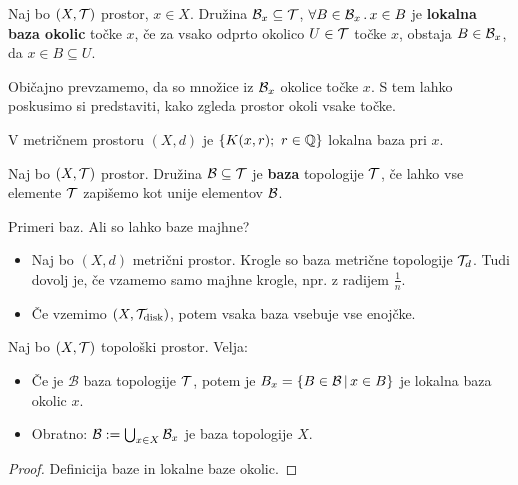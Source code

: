 \begin{definicija}
    Naj bo $(X, \mathcal{T})$ prostor, $x \in X$. Družina $\mathcal{B}_x \subseteq \mathcal{T}$, $\forall B \in \mathcal{B}_x \,.\, x \in B$ je \textbf{lokalna baza okolic} točke $x$, če za vsako odprto okolico $U \in \mathcal{T}$ točke $x$, obstaja $B \in \mathcal{B}_x$, da $x \in B \subseteq U$.
\end{definicija}

\begin{opomba}
    Običajno prevzamemo, da so množice iz $\mathcal{B}_x$ okolice točke $x$. S tem lahko poskusimo si predstaviti, kako zgleda prostor okoli vsake točke.
\end{opomba}

\begin{primer}
    V metričnem prostoru $(X, d)$ je $\{K(x,r); \ r \in \mathbb{Q}\}$ lokalna baza pri $x$.
\end{primer}

\begin{definicija}
    Naj bo $(X, \mathcal{T})$ prostor. Družina $\mathcal{B} \subseteq \mathcal{T}$ je \textbf{baza} topologije $\mathcal{T}$, če lahko vse elemente $\mathcal{T}$ zapišemo kot unije elementov $\mathcal{B}$.
\end{definicija}

\begin{primer}
    Primeri baz. Ali so lahko baze majhne?
    \begin{itemize}
        \item Naj bo $(X, d)$ metrični prostor. Krogle so baza metrične topologije $\mathcal{T}_d$. Tudi dovolj je, če vzamemo samo majhne krogle, npr. z radijem $\frac{1}{n}$.
        \item Če vzemimo $(X, \mathcal{T}_\text{disk})$, potem vsaka baza vsebuje vse enojčke.        
    \end{itemize}
\end{primer}

\newpage
\begin{trditev}
    Naj bo $(X, \mathcal{T})$ topološki prostor. Velja:
    \begin{itemize}
        \item  Če je $\mathcal{B}$ baza topologije $\mathcal{T}$, potem je $B_x = \{B \in \mathcal{B} \,|\, x \in B\}$ je lokalna baza okolic $x$.
        \item Obratno: $\mathcal{B} := \bigcup_{x \in X} \mathcal{B}_x$ je baza topologije $X$.
    \end{itemize}    
\end{trditev}

\begin{proof}
    Definicija baze in lokalne baze okolic.
\end{proof}

